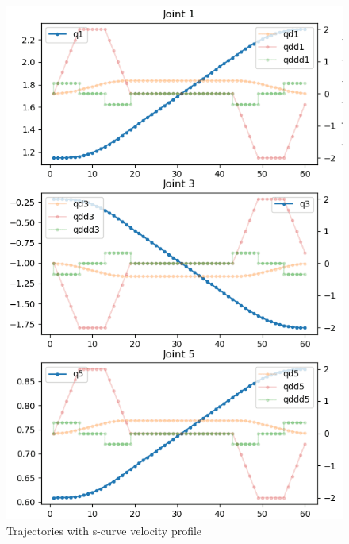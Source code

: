 \begin{frame}
\begin{columns}
\begin{center}
\begin{figure}[H]
\centering
\includegraphics[width=\textwidth]{../images/robot_planner3/3g_s_curve_half.png}
\caption{Trajectories with s-curve velocity profile}
\end{figure}
\end{center}
\end{columns}
\end{frame}
